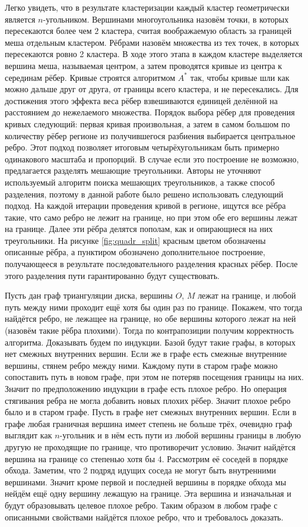 Легко увидеть, что в результате кластеризации каждый кластер геометрически является $n$-угольником. Вершинами многоугольника назовём точки, в которых пересекаются более чем $2$ кластера, считая воображаемую область за границей меша отдельным кластером. Рёбрами назовём множества из тех точек, в которых пересекаются ровно 2 кластера. В ходе этого этапа в каждом кластере выделяется вершина меша, называемая центром, а затем проводятся кривые из центра к серединам рёбер. Кривые строятся алгоритмом $A^*$ \cite{astar} так, чтобы кривые шли как можно дальше друг от друга, от границы всего кластера, и не пересекались. Для достижения этого эффекта веса рёбер взвешиваются единицей делённой на расстоянием до нежелаемого множества. Порядок выбора рёбер для проведения кривых следующий: первая кривая произвольная, а затем в самом большом по количеству рёбер регионе из получившегося разбиения выбирается центральное ребро. Этот подход позволяет итоговым четырёхугольникам быть примерно одинакового масштаба и пропорций. В случае если это построение не возможно, предлагается разделять мешающие треугольники. Авторы не уточняют используемый алгоритм поиска мешающих треугольников, а также способ разделения, поэтому в данной работе было решено использовать следующий подход. На каждой итерации проведения кривой в регионе, ищутся все рёбра такие, что само ребро не лежит на границе, но при этом обе его вершины лежат на границе. Далее эти рёбра делятся пополам, как и опирающиеся на них треугольники. На рисунке \ref{fig:quadr_split} красным цветом обозначены описанные рёбра, а пунктиром обозначено дополнительное построение, получающееся в результате последовательного разделения красных рёбер. После этого разделения пути гарантированно будут существовать.

Пусть дан граф триангуляции диска, вершины $O$, $M$ лежат на границе, и любой путь между ними проходит ещё хотя бы один раз по границе. Покажем, что тогда найдётся ребро, не лежащее на границе, но обе вершины которого лежат на ней (назовём такие рёбра плохими). Тогда по контрапозиции получим корректность алгоритма.
%
Доказывать будем по индукции. Базой будут такие графы, в которых нет смежных внутренних вершин. Если же в графе есть смежные внутренние вершины, стянем ребро между ними. Каждому пути в старом графе можно сопоставить путь в новом графе, при этом не потеряв посещения границы на них. Значит по предположению индукции в графе есть плохое ребро. Но операция стягивания ребра не могла добавить новых плохих рёбер. Значит плохое ребро было и в старом графе.
%
Пусть в графе нет смежных внутренних вершин. Если в графе любая граничная вершина имеет степень не больше трёх, очевидно граф выглядит как $n$-угольник и в нём есть пути из любой вершины границы в любую другую не проходящие по границе, что противоречит условию. Значит найдётся вершина на границе со степенью хотя бы 4. Рассмотрим её соседей в порядке обхода. Заметим, что 2 подряд идущих соседа не могут быть внутренними вершинами. Значит кроме первой и последней вершины в порядке обхода мы нейдём ещё одну вершину лежащую на границе. Эта вершина и изначальная и будут образовывать целевое плохое ребро.
%
Таким образом в любом графе с описанными свойствами найдётся плохое ребро, что и требовалось доказать.

